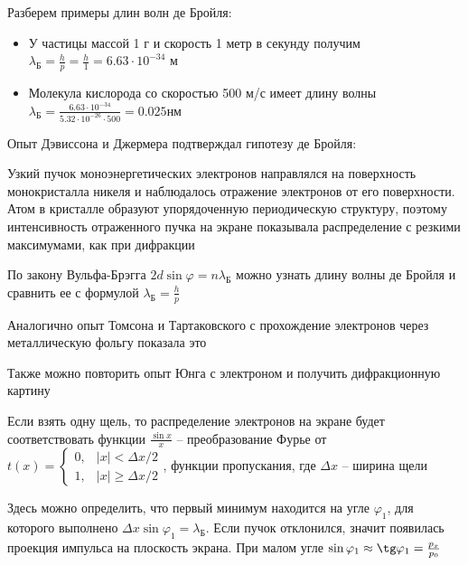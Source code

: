 \documentclass[12pt]{article}
\begin{document}






Разберем примеры длин волн де Бройля:

\begin{itemize}
    \item У частицы массой 1 г и скорость 1 метр в секунду получим $\lambda_{\text{Б}} = \frac{h}{p} = \frac{h}{1} = 6.63 \cdot 10^{-34}$ м

    \item Молекула кислорода со скоростью 500 м/с имеет длину волны $\lambda_{\text{Б}} = \frac{6.63 \cdot 10^{-34}}{5.32 \cdot 10^{-26} \cdot 500} = 0.025 \text{нм}$
\end{itemize}

Опыт Дэвиссона и Джермера подтверждал гипотезу де Бройля:

Узкий пучок моноэнергетических электронов направлялся на поверхность монокристалла никеля и наблюдалось отражение электронов от его поверхности. Атом в кристалле образуют упорядоченную периодическую структуру, поэтому интенсивность отраженного пучка на экране показывала распределение с резкими максимумами, как при дифракции

По закону Вульфа-Брэгга $2d \sin \varphi = n \lambda_{\text{Б}}$ можно узнать длину волны де Бройля и сравнить ее с формулой $\lambda_{\text{Б}} = \frac{h}{p}$


Аналогично опыт Томсона и Тартаковского с прохождение электронов через металлическую фольгу показала это

Также можно повторить опыт Юнга с электроном и получить дифракционную картину


Если взять одну щель, то распределение электронов на экране будет соответствовать функции $\frac{\sin x}{x}$ -- преобразование Фурье от $t(x) = \begin{cases}0, & |x| < \Delta x / 2 \\ 1, & |x| \geq \Delta x / 2 \end{cases}$, функции пропускания, где $\Delta x$ -- ширина щели

Здесь можно определить, что первый минимум находится на угле $\varphi_1$, для которого выполнено $\Delta x \sin \varphi_1 = \lambda_{\text{Б}}$. Если пучок отклонился, значит появилась проекция импульса на плоскость экрана. При малом угле $\sin \varphi_1 \approx \tg \varphi_1 = \frac{p_x}{p_0}$
\end{document}
